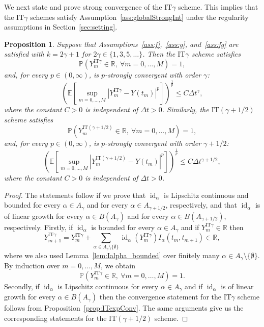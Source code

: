 \documentclass[11pt]{amsart}
\newtheorem{proposition}[theorem]{Proposition}
\newcommand{\E}{{\mathbb E}}
\newcommand{\PP}{{\mathbb P}}
\newcommand{\IT}{\textrm{IT}}
\newcommand{\id}{\operatorname{id}}
\begin{document}
{We next state and prove strong convergence of the $\IT \gamma$ scheme. This implies that the $\IT \gamma$ schemes satisfy Assumption~\ref{ass:globalStrongInt} under the regularity assumptions in Section~\ref{sec:setting}.
\begin{proposition}\label{prop:IT_conv_add}
Suppose that Assumptions~\ref{ass:f},~\ref{ass:g}, and~\ref{ass:fg} are satisfied with $k = 2 \gamma + 1$ for $2 \gamma \in \{1,3,5,\ldots \}$. Then the $\IT \gamma$ scheme satisfies
\begin{equation*}
\PP (Y^{\IT \gamma}_{m} \in \mathbb{R},\ \forall m = 0,\ldots,M) = 1,
\end{equation*}
and, for every $p \in (0,\infty)$, is $p$-strongly convergent with order $\gamma$:
\begin{equation*}
\left( \E \left[ \sup_{m=0, \ldots, M} | Y_{m}^{\IT \gamma} - Y(t_{m}) |^{p} \right] \right)^{\frac{1}{p}} \leq C \Delta t^{\gamma},
\end{equation*}
where the constant $C>0$ is independent of $\Delta t >0$. Similarly, the $\IT (\gamma+1/2)$ scheme satisfies
\begin{equation*}
\PP (Y^{\IT (\gamma+1/2)}_{m} \in \mathbb{R},\ \forall m = 0,\ldots,M) = 1,
\end{equation*}
and, for every $p \in (0,\infty)$, is $p$-strongly convergent with order $\gamma+1/2$:
\begin{equation*}
\left( \E \left[ \sup_{m=0, \ldots, M} | Y_{m}^{\IT (\gamma+1/2)} - Y(t_{m}) |^{p} \right] \right)^{\frac{1}{p}} \leq C \Delta t^{\gamma+1/2},
\end{equation*}
where the constant $C>0$ is independent of $\Delta t >0$.
\end{proposition}
\begin{proof}
The statements follow if we prove that $\id_{\alpha}$ is Lipschitz continuous and bounded for every $\alpha \in A_{\gamma}$ and for every $\alpha \in A_{\gamma+1/2}$, respectively, and that $\id_{\alpha}$ is of linear growth for every $\alpha \in B \left( A_{\gamma} \right)$ and for every $\alpha \in B\left( A_{\gamma+1/2} \right)$, respectively. Firstly, if $\id_{\alpha}$ is bounded for every $\alpha \in A_{\gamma}$ and if $Y^{\IT \gamma}_{m} \in \mathbb{R}$ then
\begin{equation*}
Y^{\IT \gamma}_{m+1} = Y^{\IT \gamma}_{m} +  \sum_{\alpha \in A_{\gamma} \setminus \{  \emptyset \}} \operatorname{id}_{\alpha}(Y^{\IT \gamma}_{m}) I_{\alpha}(t_{m},t_{m+1}) \in \mathbb{R},
\end{equation*}
where we also used Lemma~\ref{lem:Ialpha_bounded} over finitely many $\alpha \in A_{\gamma} \setminus \{  \emptyset \}$. By induction over $m=0,\ldots,M$, we obtain
\begin{equation*}
\PP (Y^{\IT \gamma}_{m} \in \mathbb{R},\ \forall m = 0,\ldots,M) = 1.
\end{equation*}
Secondly, if $\id_{\alpha}$ is Lipschitz continuous for every $\alpha \in A_{\gamma}$ and if $\id_{\alpha}$ is of linear growth for every $\alpha \in B \left( A_{\gamma} \right)$ then the convergence statement for the $\IT \gamma$ scheme follows from Proposition~\ref{prop:ITexpConv}. The same arguments give us the corresponding statements for the $\IT (\gamma+1/2)$ scheme. 


\end{proof}}
\end{document}

